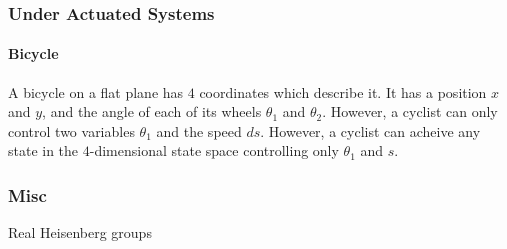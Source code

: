 \documentclass{article}
\theoremstyle{definition}
\theoremstyle{definition}
\theoremstyle{plain}
\renewcommand{\(}{\left(}
\renewcommand{\)}{\right)}
\begin{document}
\subsubsection*{Under Actuated Systems}
\paragraph{Bicycle}
A bicycle on a flat plane has $4$ coordinates which describe it.  It has a position $x$ and $y$, and the angle of each of its wheels $\theta_1$ and $\theta_2$.  However, a cyclist can only control two variables $\theta_1$ and the speed $ds$.  However, a cyclist can acheive any state in the $4$-dimensional state space controlling only $\theta_1$ and $s$.

\subsubsection*{Misc}
Real Heisenberg groups
\end{document}
